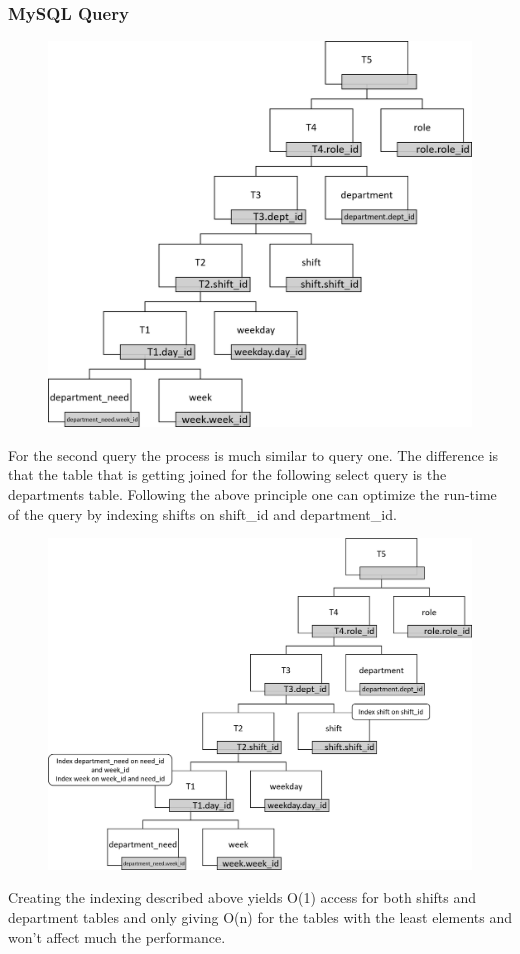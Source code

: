 \documentclass[letter,12pt]{texMemo}
\begin{document}
\subsubsection*{MySQL Query}
	
\begin{figure}[H]
	\centering
	\includegraphics[width=.75\textwidth]{query2.png}
\end{figure}
For the second query the process is much similar to query one. The difference is that the table that is getting joined for the following select query is the departments table. Following the above principle one can optimize the run-time of the query by indexing shifts on shift\_id and department\_id. 
\begin{figure}[H]
	\centering
	\includegraphics[width=.75\textwidth]{query2_indexed.png}
\end{figure}
Creating the indexing described above yields O(1) access for both shifts and department tables and only giving O(n) for the tables with the least elements and won't affect much the performance.
\vspace{1em}
\end{document}
